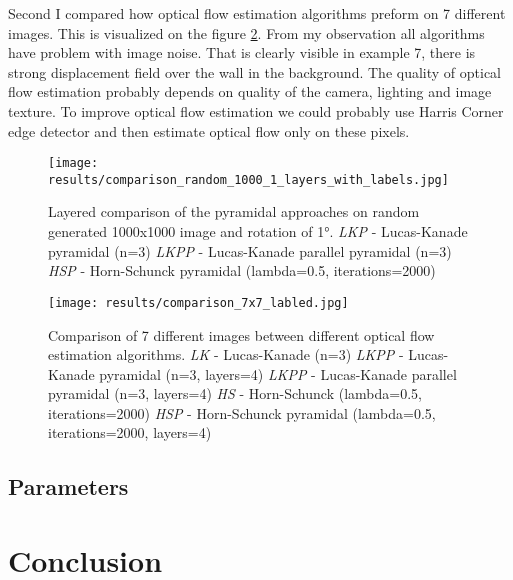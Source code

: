 \documentclass[runningheads]{llncs}
\begin{document}
Second I compared how optical flow estimation algorithms preform on 7 different images. This is visualized on the figure \ref{img_1}. From my observation all algorithms have problem with image noise. That is clearly visible in example 7, there is strong displacement field over the wall in the background. The quality of optical flow estimation probably depends on quality of the camera, lighting and image texture. To improve optical flow estimation we could probably use Harris Corner edge detector and then estimate optical flow only on these pixels.

\begin{figure}[ht!]
    \centering
    \texttt{[image: results/comparison\_random\_1000\_1\_layers\_with\_labels.jpg]}
    \caption{Layered comparison of the pyramidal approaches on random generated 1000x1000 image and rotation of \ang{1}.
    \newline 
    \newline\textit{LKP} - Lucas-Kanade pyramidal (n=3)
    \newline\textit{LKPP} - Lucas-Kanade parallel pyramidal (n=3)
    \newline\textit{HSP} - Horn-Schunck pyramidal (lambda=0.5, iterations=2000)
    \label{img_0}}
\end{figure}

\begin{figure}[ht!]
    \centering
    \texttt{[image: results/comparison\_7x7\_labled.jpg]}
    \caption{Comparison of 7 different images between different optical flow estimation algorithms.
    \newline
    \newline\textit{LK} - Lucas-Kanade (n=3)
    \newline\textit{LKPP} - Lucas-Kanade pyramidal (n=3, layers=4)
    \newline\textit{LKPP} - Lucas-Kanade parallel pyramidal (n=3, layers=4)
    \newline\textit{HS} - Horn-Schunck (lambda=0.5, iterations=2000)
    \newline\textit{HSP} - Horn-Schunck pyramidal (lambda=0.5, iterations=2000, layers=4)
    \label{img_1}}
\end{figure}

\subsection{Parameters}

\section{Conclusion}
\end{document}
